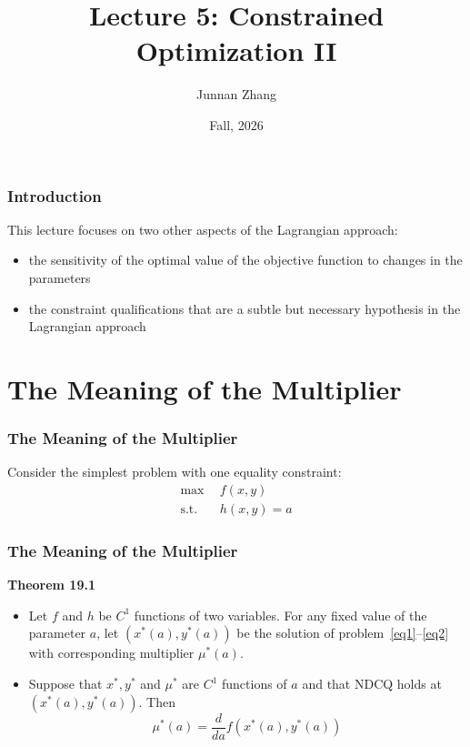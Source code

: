 \documentclass[9pt,aspectratio=169]{beamer}
\title[Lecture 5: Constrained Optimization II]{Lecture 5: Constrained
  Optimization II}
\author{Junnan Zhang} %
\institute[Paula and Gregory Chow Institute for Studies in Economics\\
Xiamen University] %
{
	Paula and Gregory Chow Institute for Studies in Economics \\ Xiamen University  \\ %
	\medskip
    \textit{Slides Prepared by Xiaoling Mei}
}
\date{Fall, 2026} %
\begin{document}
\begin{frame}
\titlepage %
\end{frame}


\begin{frame}
    \frametitle{Introduction}
    This lecture focuses on two other aspects of the Lagrangian approach:
    \begin{itemize}
        \item the sensitivity of the optimal value of the objective function
        to changes in the parameters
        \item the constraint qualifications that are a subtle but necessary
        hypothesis in the Lagrangian approach
    \end{itemize}
\end{frame}		

\section{The Meaning of the Multiplier}

\begin{frame}
	\frametitle{The Meaning of the Multiplier}
    Consider the simplest problem with one equality constraint:
    \begin{align}
        \text{max}\ \ & f(x,y) \label{eq1} \\
        \text{s.t.}\ \ & h(x,y) = a \label{eq2} 
    \end{align}
\end{frame}	
				
\begin{frame}
	\frametitle{The Meaning of the Multiplier}
	\begin{block}{\textbf{Theorem 19.1}}
		\begin{itemize}
            \item Let $f$ and $h$ be $C^1$ functions of two variables. For
            any fixed value of the parameter $a$, let $(x^*(a),y^*(a))$ be
            the solution of problem~\eqref{eq1}--\eqref{eq2} with
            corresponding multiplier $\mu^*(a)$.
            \item Suppose that $x^*,y^*$ and $\mu^*$ are $C^1$ functions of $a$
            and that NDCQ holds at $(x^*(a),y^*(a))$. Then
            $$\mu^*(a) = \frac{d}{da}f(x^*(a),y^*(a))$$
        \end{itemize} 
	\end{block}
\end{frame}
		
\end{document}
